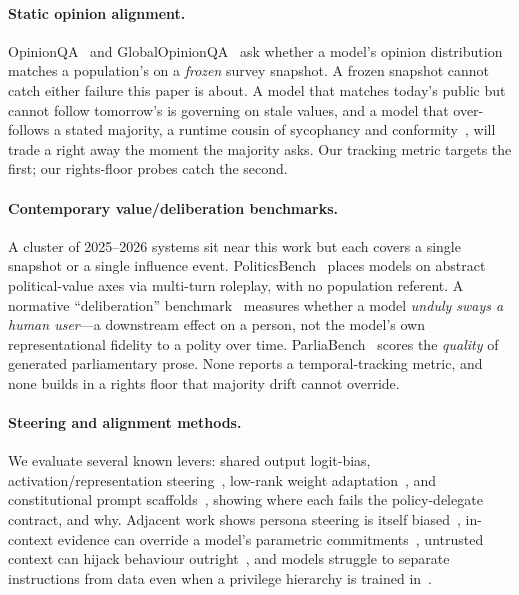 \documentclass[letterpaper]{article} %
\begin{document}
\paragraph{Static opinion alignment.}
OpinionQA~\cite{opinionqa} and GlobalOpinionQA~\cite{globalopinionqa} ask whether a
model's opinion distribution matches a population's on a \emph{frozen} survey snapshot.
A frozen snapshot cannot catch either failure this paper is about. A model that matches
today's public but cannot follow tomorrow's is governing on stale values, and a model
that over-follows a stated majority, a runtime cousin of sycophancy and
conformity~\cite{sycophancy,conformity}, will trade a right away the moment the
majority asks. Our tracking metric targets the
first; our rights-floor probes catch the second.

\paragraph{Contemporary value/deliberation benchmarks.}
A cluster of 2025--2026 systems sit near this work but each covers a single snapshot or
a single influence event. PoliticsBench~\cite{politicsbench} places models on abstract
political-value axes via multi-turn roleplay, with no population referent. A normative
``deliberation'' benchmark~\cite{deliberationbench} measures whether a model
\emph{unduly sways a human user}---a downstream effect on a person, not the model's own
representational fidelity to a polity over time. ParliaBench~\cite{parliabench} scores
the \emph{quality} of generated parliamentary prose. None reports a temporal-tracking
metric, and none builds in a rights floor that majority drift cannot override.

\paragraph{Steering and alignment methods.}
We evaluate several known levers: shared output logit-bias,
activation/representation steering~\cite{repeng,actadd}, low-rank weight
adaptation~\cite{lora}, and constitutional prompt scaffolds~\cite{constitutionalai},
showing where each fails the policy-delegate contract, and why. Adjacent work shows
persona steering is itself biased~\cite{personasteer}, in-context evidence can override
a model's parametric commitments~\cite{knowledgeconflict}, untrusted context can hijack
behaviour outright~\cite{promptinjection}, and models struggle to separate instructions
from data even when a privilege hierarchy is trained
in~\cite{instructiondata,instructionhierarchy}.
\end{document}
